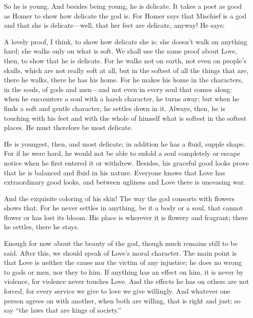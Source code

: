  So he is young. And besides being young, he is delicate. It
takes a poet as good as Homer to show how delicate the god is. For Homer
says that Mischief is a god and that she is delicate---well, that her
feet are delicate, anyway! He says:

\blank[line]
\par
{}
\blank[line]

 A lovely proof, I think, to show how delicate she is: she
doesn't walk on anything hard; she walks only on what is soft. We shall
use the same proof about Love, then, to show that he is delicate. For he
walks not on earth, not even on people's skulls, which are not really
soft at all, but in the softest of all the things that are, there he
walks, there he has his home. For he makes his home in the characters,
in the souls, of gods and men---and not even in every soul that comes
along: when he encounters a soul with a harsh character, he turns away;
but when he finds a soft and gentle character, he settles down in it.
Always, then, he is touching with his feet  and with the
whole of himself what is softest in the softest places. He must
therefore be most delicate.

He is youngest, then, and most delicate; in addition he has a fluid,
supple shape. For if he were hard, he would not be able to enfold a soul
completely or escape notice when he first entered it or withdrew.
Besides, his graceful good looks prove that he is balanced and fluid in
his nature. Everyone knows that Love has extraordinary good looks, and
between ugliness and Love there is unceasing war.

And the exquisite coloring of his skin! The way the god consorts with
 flowers shows that. For he never settles in anything, be it a
body or a soul, that cannot flower or has lost its bloom. His place is
wherever it is flowery and fragrant; there he settles, there he stays.

Enough for now about the beauty of the god, though much remains still to
be said. After this, we should speak of Love's moral
character. The main
point is that Love is neither the cause nor the victim of any injustice;
he does no wrong to gods or men, nor they to him. If anything has an
effect on him, it is never by violence, for violence never touches Love.
 And the effects he has on others are not forced, for every
service we give to love we give willingly. And whatever one person
agrees on with another, when both are willing, that is right and just;
so say “the laws that are kings of
society.”

